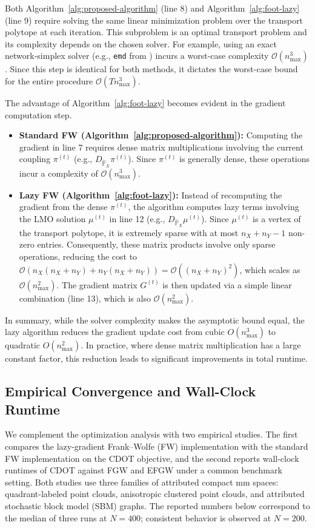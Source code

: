 \documentclass{article}
\theoremstyle{plain}
\theoremstyle{definition}
\theoremstyle{remark}
\begin{document}
Both Algorithm~\ref{alg:proposed-algorithm} (line 8) and Algorithm~\ref{alg:foot-lazy} (line 9) require solving the same linear minimization problem over the transport polytope at each iteration. This subproblem is an optimal transport problem and its complexity depends on the chosen solver. For example, using an exact network-simplex solver (e.g., \texttt{emd} from \citep{flamary2021pot}) incurs a worst-case complexity $\mathcal{O}(n_{\max}^3)$. Since this step is identical for both methods, it dictates the worst-case bound for the entire procedure $\mathcal{O}(Tn_{\max}^3)$.

The advantage of Algorithm~\ref{alg:foot-lazy} becomes evident in the gradient computation step. 
\begin{itemize}
	\item \textbf{Standard FW (Algorithm~\ref{alg:proposed-algorithm}):} Computing the gradient in line 7 requires dense matrix multiplications involving the current coupling $\pi^{(t)}$ (e.g., $D_{\hat{\mathbb{P}}_X} \pi^{(t)}$). Since $\pi^{(t)}$ is generally dense, these operations incur a complexity of $\mathcal{O}(n_{\max}^3)$.
	\item \textbf{Lazy FW (Algorithm~\ref{alg:foot-lazy}):} Instead of recomputing the gradient from the dense $\pi^{(t)}$, the algorithm computes lazy terms involving the LMO solution $\mu^{(t)}$ in line 12 (e.g., $D_{\hat{\mathbb{P}}_X} \mu^{(t)}$). Since $\mu^{(t)}$ is a vertex of the transport polytope, it is extremely sparse with at most $n_X + n_Y - 1$ non-zero entries. Consequently, these matrix products involve only sparse operations, reducing the cost to $\mathcal{O}(n_X(n_X + n_Y) + n_Y(n_X + n_Y)) = \mathcal{O}((n_X + n_Y)^2)$, which scales as $\mathcal{O}(n_{\max}^2)$. The gradient matrix $G^{(t)}$ is then updated via a simple linear combination (line 13), which is also $\mathcal{O}(n_{\max}^2)$.
\end{itemize}
In summary, while the solver complexity makes the asymptotic bound equal, the lazy algorithm reduces the gradient update cost from cubic $O(n_{\max}^3)$ to quadratic $O(n_{\max}^2)$. In practice, where dense matrix multiplication has a large constant factor, this reduction leads to significant improvements in total runtime.

\subsection{Empirical Convergence and Wall-Clock Runtime}\label{App:convergence-runtime}
We complement the optimization analysis with two empirical studies. The first compares the lazy-gradient Frank--Wolfe (FW) implementation with the standard FW implementation on the CDOT objective, and the second reports wall-clock runtimes of CDOT against FGW and EFGW under a common benchmark setting. Both studies use three families of attributed compact mm spaces: quadrant-labeled point clouds, anisotropic clustered point clouds, and attributed stochastic block model (SBM) graphs. The reported numbers below correspond to the median of three runs at $N=400$; consistent behavior is observed at $N=200$.
\end{document}
